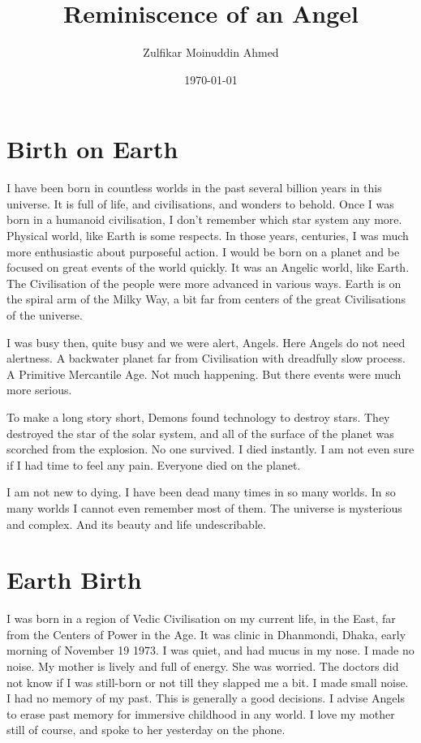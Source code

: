 \documentclass{amsart}
\title{Reminiscence of an Angel}
\author{Zulfikar Moinuddin Ahmed}
\date{\today}
\begin{document}
\maketitle

\section{Birth on Earth}

I have been born in countless worlds in the past several billion years in this universe.  It is full of life, and civilisations, and wonders to behold.  Once I was born in a humanoid civilisation, I don't remember which star system any more.  Physical world, like Earth is some respects.  In those years, centuries, I was much more enthusiastic about purposeful action.  I would be born on a planet and be focused on great events of the world quickly.  It was an Angelic world, like Earth.  The Civilisation of the people were more advanced in various ways.  Earth is on the spiral arm of the Milky Way, a bit far from centers of the great Civilisations of the universe.  

I was busy then, quite busy and we were alert, Angels.  Here Angels do not need alertness.  A backwater planet far from Civilisation with dreadfully slow process.  A Primitive Mercantile Age.  Not much happening.  But there events were much more serious.  

To make a long story short, Demons found technology to destroy stars.  They destroyed the star of the solar system, and all of the surface of the planet was scorched from the explosion.  No one survived.  I died instantly.  I am not even sure if I had time to feel any pain.  Everyone died on the planet.  

I am not new to dying.  I have been dead many times in so many worlds.  In so many worlds I cannot even remember most of them.  The universe is mysterious and complex.  And its beauty and life undescribable.  

\section{Earth Birth}

I was born in a region of Vedic Civilisation on my current life, in the East, far from the Centers of Power in the Age.  It was clinic in Dhanmondi, Dhaka, early morning of November 19 1973.  I was quiet, and had mucus in my nose.  I made no noise.  My mother is lively and full of energy.  She was worried.  The doctors did not know if I was still-born or not till they slapped me a bit.  I made small noise.  I had no memory of my past.  This is generally a good decisions.  I advise Angels to erase past memory for immersive childhood in any world.  I love my mother still of course, and spoke to her yesterday on the phone.  
\end{document}
